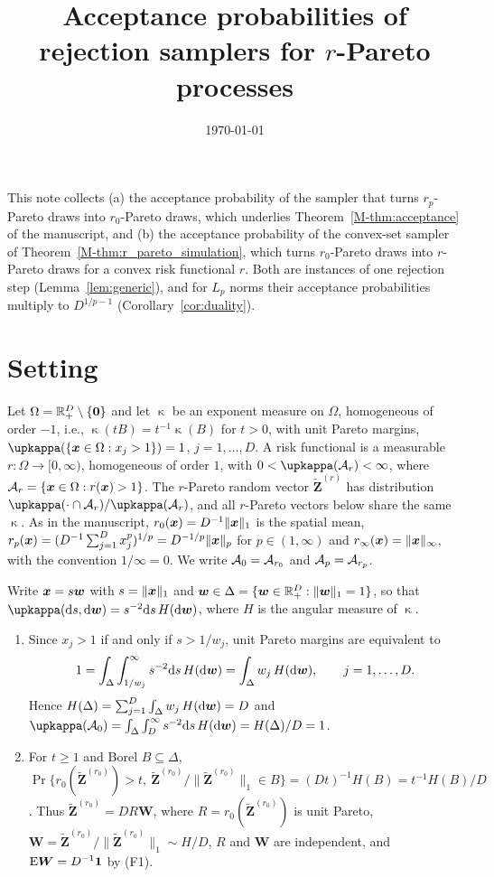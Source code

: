 \documentclass[12pt]{article}
\newcommand{\Zr}[1]{\bm{\tilde Z}^{(#1)}}
\newcommand{\bW}{\bm W}
\newcommand{\one}{\bm 1}
\begin{document}
\title{Acceptance probabilities of rejection samplers for $r$-Pareto processes}
\date{\today}
\maketitle

\noindent This note collects (a) the acceptance probability of the sampler that turns $r_p$-Pareto draws into $r_0$-Pareto draws, which underlies Theorem~\ref{M-thm:acceptance} of the manuscript, and (b) the acceptance probability of the convex-set sampler of Theorem~\ref{M-thm:r_pareto_simulation}, which turns $r_0$-Pareto draws into $r$-Pareto draws for a convex risk functional $r$. Both are instances of one rejection step (Lemma~\ref{lem:generic}), and for $L_p$ norms their acceptance probabilities multiply to $D^{1/p-1}$ (Corollary~\ref{cor:duality}).

\section{Setting}

Let $\Omega={\mathbb R}^D_+\setminus\{\bm 0\}$ and let $\upkappa$ be an exponent measure on $\Omega$, homogeneous of order $-1$, i.e., $\upkappa(tB)=t^{-1}\upkappa(B)$ for $t>0$, with unit Pareto margins, $\upkappa(\{\bx\in\Omega:x_j>1\})=1$, $j=1,\dots,D$. A risk functional is a measurable $r:\Omega\to[0,\infty)$, homogeneous of order $1$, with $0<\upkappa(\calA_r)<\infty$, where ${\mathcal A}_r=\{{\boldsymbol{x}}\in\Omega:r({\boldsymbol{x}})>1\}$. The $r$-Pareto random vector $\Zr{r}$ has distribution $\upkappa(\cdot\cap\calA_r)/\upkappa(\calA_r)$, and all $r$-Pareto vectors below share the same $\upkappa$. As in the manuscript, $r_0({\boldsymbol{x}})=D^{-1}\|{\boldsymbol{x}}\|_1$ is the spatial mean, $r_p({\boldsymbol{x}})=(D^{-1}\sum_{j=1}^Dx_j^p)^{1/p}=D^{-1/p}\|{\boldsymbol{x}}\|_p$ for $p\in(1,\infty)$ and $r_\infty({\boldsymbol{x}})=\|{\boldsymbol{x}}\|_\infty$, with the convention $1/\infty=0$. We write ${\mathcal A}_0={\mathcal A}_{r_0}$ and ${\mathcal A}_p={\mathcal A}_{r_p}$.

Write ${\boldsymbol{x}}=s{\boldsymbol{w}}$ with $s=\|{\boldsymbol{x}}\|_1$ and ${\boldsymbol{w}}\in\Delta=\{{\boldsymbol{w}}\in{\mathbb R}^D_+:\|{\boldsymbol{w}}\|_1=1\}$, so that $\upkappa(\text ds,\text d\bw)=s^{-2}\text ds\,H(\text d\bw)$, where $H$ is the angular measure of $\upkappa$.

\begin{enumerate}[(F1)]
\item Since $x_j>1$ if and only if $s>1/w_j$, unit Pareto margins are equivalent to
$$
1=\int_\Delta\int_{1/w_j}^\infty s^{-2}\text ds\,H(\text d{\boldsymbol{w}})=\int_\Delta w_j\,H(\text d{\boldsymbol{w}}),\qquad j=1,\dots,D.
$$
Hence $H(\Delta)=\sum_{j=1}^D\int_\Delta w_j\,H(\text d{\boldsymbol{w}})=D$ and $\upkappa(\calA_0)=\int_\Delta\int_D^\infty s^{-2}\text ds\,H(\text d\bw)=H(\Delta)/D=1$.
\item For $t\geq1$ and Borel $B\subseteq\Delta$, $\Pr\{r_0(\Zr{r_0})>t,\ \Zr{r_0}/\|\Zr{r_0}\|_1\in B\}=(Dt)^{-1}H(B)=t^{-1}H(B)/D$. Thus $\Zr{r_0}=DR\bW$, where $R=r_0(\Zr{r_0})$ is unit Pareto, $\bW=\Zr{r_0}/\|\Zr{r_0}\|_1\sim H/D$, $R$ and $\bW$ are independent, and $\E\bW=D^{-1}\one$ by (F1).
\end{enumerate}
\end{document}
